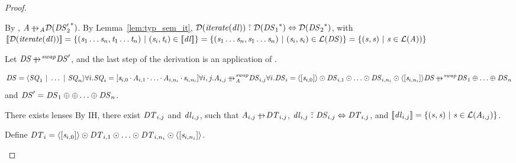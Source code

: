\documentclass[acmsmall]{acmart}
\begin{document}
\begin{proof}
\begin{case}[\ParallelSwapAtomStructuralRewriteRule{}]
    By \ParallelSwapAtomStructuralRewriteRule{},
    $\Atom \ParallelRewriteAtom \AtomToDNFOf{\StarOf{\DNFRegex_2'}}$.
    By Lemma~\ref{lem:typ_sem_it},
    $\mathcal{D}(\mathit{\mathit{iterate}(\mathit{dl})}) \,\,\tilde{:}\,\,
    \mathcal{D}({\mathit{DS}_1}^*) \Leftrightarrow
    \mathcal{D}({\mathit{DS}_2}^*)$, with
    $[ \! [\mathcal{D}(\mathit{\mathit{iterate}(\mathit{dl})})] \! ]
    = \{(\mathit{s}_1\ldots\mathit{s}_n,\mathit{t}_1\ldots\mathit{t}_n)
      ~|~ (\mathit{s}_i,\mathit{t}_i) \in [ \! [\mathit{dl}] \! ]\}
    = \{(\mathit{s}_1\ldots\mathit{s}_n,\mathit{s}_1\ldots\mathit{s}_n)
      ~|~ (\mathit{s}_i,\mathit{s}_i) \in \mathcal{L}(\mathit{DS})\}
    = \{(\mathit{s},\mathit{s}) ~|~ \mathit{s} \in \mathcal{L}(\mathit{A}))\}$
  \end{case}

  \begin{case}[\ParallelSwapDNFStructuralRewriteRule{}]
    Let $\DNFRegex \ParallelRewriteSwap \DNFRegex'$, and the last step of the
    derivation is an application of \ParallelSwapDNFStructuralRewriteRule{}.

    \[
      {
        \DNFRegex = \DNFOf{\Sequence_1 \DNFSep \ldots \DNFSep \Sequence_n}\\
        \forall i. \Sequence_i =
        \SequenceOf{\String_{i,0} \SeqSep \Atom_{i,1} \SeqSep \ldots \SeqSep \Atom_{i,n_i} \SeqSep \String_{i,n_i}}\\
        \forall i,j. \Atom_{i,j} \ParallelRewriteSwapAtom \DNFRegex_{i,j}\\
        \forall i. \DNFRegex_i = \DNFOf{\SequenceOf{\String_{i,0}}} \ConcatDNF \DNFRegex_{i,1}
        \ConcatDNF \ldots \ConcatDNF \DNFRegex_{i,n_i} \ConcatDNF
        \DNFOf{\SequenceOf{\String_{i,n_i}}}
      }
      {
        \DNFRegex \ParallelRewriteSwap \DNFRegex_1 \OrDNF \ldots \OrDNF \DNFRegex_n
      }
    \]
    and $\mathit{DS}' = \mathit{DS}_1 \oplus \oplus \ldots \oplus \mathit{DS}_n$.

    There exists lenses
    By IH, there exist $\mathit{DT}_{i,j}$ and $\mathit{dl}_{i,j}$, such that
    $\Atom_{i,j} \ParallelRewrite \DNFRegexAlt_{i,j}$,
    $\mathit{dl}_{i,j} \,\,\tilde{:}\,\,
    \mathit{DS}_{i,j} \Leftrightarrow \mathit{DT}_{i,j}$,
    and $[ \! [\mathit{dl}_{i,j}] \! ] =
    \{(\mathit{s},\mathit{s}) ~|~ \mathit{s} \in \mathcal{L}(\mathit{A}_{i,j})\}$.

    Define $\mathit{DT}_i =
    \langle[\mathit{s}_{i,0}]\rangle \odot \mathit{DT}_{i,1}
    \odot \ldots \odot
    \mathit{DT}_{i,n_i} \odot \langle[\mathit{s}_{i,n_i}]\rangle$.


\end{case}
\end{proof}
\end{document}
